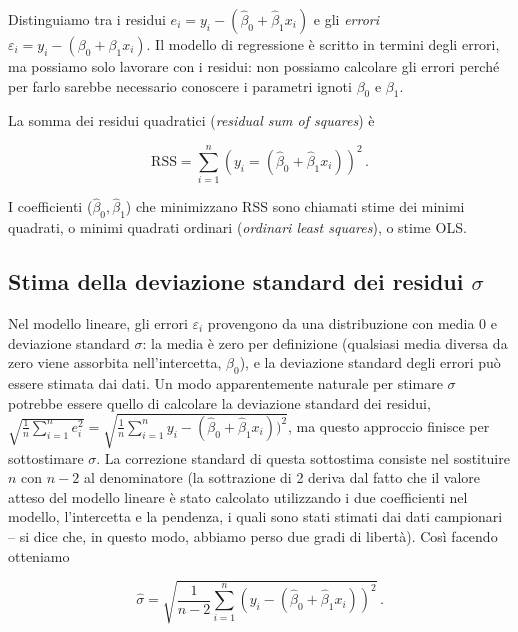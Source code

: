 \documentclass[
  11pt,
]{krantz}
\theoremstyle{definition}
\theoremstyle{definition}
\theoremstyle{definition}
\theoremstyle{definition}
\theoremstyle{remark}
\begin{document}
Distinguiamo tra i residui \(e_i = y_i - (\hat{\beta}_0 + \hat{\beta}_1 x_i)\) e gli \emph{errori} \(\varepsilon_i = y_i − (\beta_0 + \beta_1 x_i)\). Il modello di regressione è scritto in termini degli errori, ma possiamo solo lavorare con i residui: non possiamo calcolare gli errori perché per farlo sarebbe necessario conoscere i parametri ignoti \(\beta_0\) e \(\beta_1\).

La somma dei residui quadratici (\emph{residual sum of squares}) è

\begin{equation}
\text{RSS} = \sum_{i=1}^n (y_i = (\hat{\beta}_0 + \hat{\beta}_1 x_i))^2\,.
\end{equation}

I coefficienti (\(\hat{\beta}_0, \hat{\beta}_1\)) che minimizzano RSS sono chiamati stime dei minimi quadrati, o minimi quadrati ordinari (\emph{ordinari least squares}), o stime OLS.

\hypertarget{stima-della-deviazione-standard-dei-residui-sigma}{%
\subsection{\texorpdfstring{Stima della deviazione standard dei residui \(\sigma\)}{Stima della deviazione standard dei residui \textbackslash sigma}}\label{stima-della-deviazione-standard-dei-residui-sigma}}

Nel modello lineare, gli errori \(\varepsilon_i\) provengono da una distribuzione con media 0 e deviazione standard \(\sigma\): la media è zero per definizione (qualsiasi media diversa da zero viene assorbita nell'intercetta, \(\beta_0\)), e la deviazione standard degli errori può essere stimata dai dati. Un modo apparentemente naturale per stimare \(\sigma\) potrebbe essere quello di calcolare la deviazione standard dei residui, \(\sqrt{\frac{1}{n} \sum_{i=1}^n e_i^2} = \sqrt{ \frac{1}{n} \sum_{i=1}^n y_i - (\hat{\beta}_0 + \hat{\beta}_1 x_i))^2}\), ma questo approccio finisce per sottostimare \(\sigma\). La correzione standard di questa sottostima consiste nel sostituire \(n\) con \(n - 2\) al denominatore (la sottrazione di 2 deriva dal fatto che il valore atteso del modello lineare è stato calcolato utilizzando i due coefficienti nel modello, l'intercetta e la pendenza, i quali sono stati stimati dai dati campionari -- si dice che, in questo modo, abbiamo perso due gradi di libertà). Così facendo otteniamo

\begin{equation}
\hat{\sigma} = \sqrt{\frac{1}{n-2} \sum_{i=1}^n (y_i - (\hat{\beta}_0 + \hat{\beta}_1 x_i))^2}\, .
\end{equation}
\end{document}
